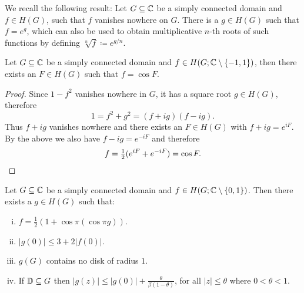 We recall the following result: Let $G \subseteq \mathbb{C}$ be a simply connected domain and $f \in H(G)$, such that $f$ vanishes nowhere on $G$. There is a $g \in H(G)$ such that $f = e^g$, which can also be used to obtain multiplicative $n$-th roots of such functions by defining $\sqrt[n]{f} \coloneqq e^{g/n}$.

\begin{lemma} \label{lem:schottky-2}
    Let $G \subseteq \mathbb{C}$ be a simply connected domain and $f \in H(G; \mathbb{C} \setminus \{ -1, 1 \})$, then there exists an $F \in H(G)$ such that $f = \cos F$.
\end{lemma}

\begin{proof}
    Since $1 - f^2$ vanishes nowhere in $G$, it has a square root $g \in H(G)$, therefore
    \begin{equation*}
        1 = f^2 + g^2 = (f + ig)(f - ig).
    \end{equation*}
    Thus $f + ig$ vanishes nowhere and there exists an $F \in H(G)$ with $f + ig = e^{iF}$. By the above we also have $f - ig = e^{-iF}$ and therefore
    \begin{equation*}
        f = {\textstyle \frac{1}{2}} (e^{iF} + e^{-iF}) = \cos F. \qedhere
    \end{equation*}
\end{proof}

\begin{lemma} \label{lem:schottky-3}
    Let $G \subseteq \mathbb{C}$ be a simply connected domain and $f \in H(G; \mathbb{C} \setminus \{ 0, 1 \})$. Then there exists a $g \in H(G)$ such that:
    \begin{enumerate}[i.]
        \item $f = \frac{1}{2} ( 1 + \cos \pi (\cos \pi g))$.
        \item $\vert g(0) \vert \leq 3 + 2 \vert f(0) \vert$.
        \item $g(G)$ contains no disk of radius $1$.
        \item If $\mathbb{D} \subseteq G$ then $\vert g(z) \vert \leq \vert g(0) \vert + \frac{\theta}{\beta (1 - \theta)}$, for all $\vert z \vert \leq \theta$ where $0 < \theta < 1$.
    \end{enumerate}
\end{lemma}

